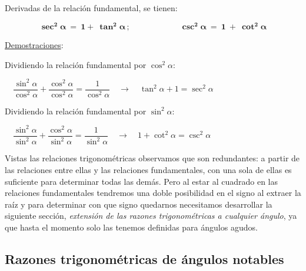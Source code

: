 \vspace{2mm} \begin{theorem} 
 
 Derivadas de la relación fundamental, se tienen:
 
 $$
 \boldsymbol{
 \sec^2 \alpha \ = \ 1 +\  \tan^2 \alpha \, ; \qquad \qquad \qquad \csc^2 \alpha \ = \  1 \ + \ \cot^2 \alpha
 } $$	
 \end{theorem}

\underline{Demostraciones}:

\vspace{2mm} Dividiendo la relación fundamental por $\cos^2 \alpha$:

\vspace{2mm} \hspace{3cm} $\quad \dfrac{\sin^2 \alpha}{\cos^2 \alpha} + \dfrac{\cos^2 \alpha}{\cos^2 \alpha} = \dfrac {1}{\cos^2 \alpha} \quad \to \quad \tan^2 \alpha + 1 = \sec^2 \alpha $ \QED

\vspace{4mm} Dividiendo la relación fundamental por $\sin^2 \alpha$:

\vspace{2mm} \hspace{3cm} $\quad \dfrac{\sin^2 \alpha}{\sin^2 \alpha} + \dfrac{\cos^2 \alpha}{\sin ^2 \alpha} = \dfrac {1}{\sin^2 \alpha} \quad \to \quad 1+\cot^2 \alpha = \csc^2 \alpha $ \QED


\vspace{4mm} Vistas las relaciones trigonométricas observamos que son redundantes: a partir de las relaciones entre ellas y las relaciones fundamentales, con una sola de ellas es suficiente para determinar todas las demás. Pero al estar al cuadrado en las relaciones fundamentales tendremos una doble posibilidad en el signo al extraer la raíz y para determinar con que signo quedarnos necesitamos desarrollar la siguiente sección, \emph{extensión de las razones trigonométricas a cualquier ángulo}, ya que hasta el momento solo las tenemos definidas para ángulos agudos.

\vspace{5mm}
\subsection{Razones trigonométricas de ángulos notables} 
\vspace{0.5cm}

